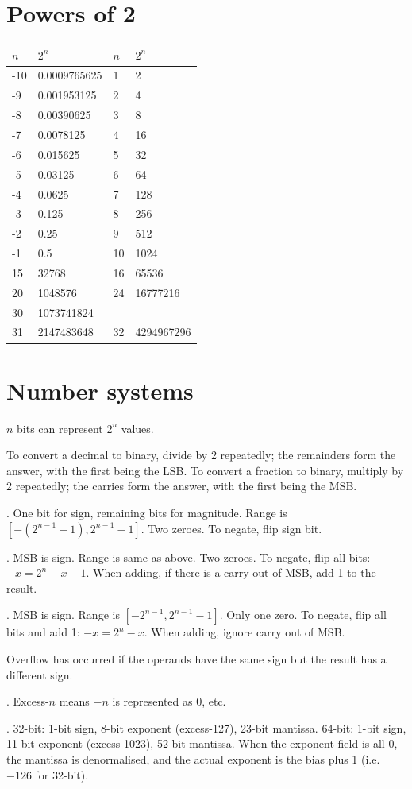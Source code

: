 \documentclass{slnotes}
\begin{document}
\chapter{Powers of 2}
\begin{tabular}{llll}
\toprule
\(n\) & \(2^n\) & \(n\) & \(2^n\) \tabularnewline
\midrule
-10 & 0.0009765625 & 1 & 2 \tabularnewline
-9  & 0.001953125  & 2 & 4 \tabularnewline
-8  & 0.00390625   & 3 & 8 \tabularnewline
-7  & 0.0078125    & 4 & 16 \tabularnewline
-6  & 0.015625     & 5 & 32 \tabularnewline
-5  & 0.03125      & 6 & 64 \tabularnewline
-4  & 0.0625       & 7 & 128 \tabularnewline
-3  & 0.125        & 8 & 256 \tabularnewline
-2  & 0.25         & 9 & 512 \tabularnewline
-1  & 0.5          & 10 & 1024 \tabularnewline
15 & 32768         & 16 & 65536 \tabularnewline
20 & 1048576       & 24 & 16777216 \tabularnewline
30 & 1073741824 \tabularnewline
31 & 2147483648    & 32 & 4294967296 \tabularnewline
\bottomrule
\end{tabular}
\chapter{Number systems}
\(n\) bits can represent \(2^n\) values.

To convert a decimal to binary, divide by 2 repeatedly; the remainders form the answer, with the first being the LSB. To convert a fraction to binary, multiply by 2 repeatedly; the carries form the answer, with the first being the MSB.

. One bit for sign, remaining bits for magnitude. Range is \([-(2^{n-1}-1), 2^{n-1}-1]\). Two zeroes. To negate, flip sign bit.

. MSB is sign. Range is same as above. Two zeroes. To negate, flip all bits: \(-x = 2^n - x - 1\). When adding, if there is a carry out of MSB, add 1 to the result.

. MSB is sign. Range is \([-2^{n-1}, 2^{n-1}-1]\). Only one zero. To negate, flip all bits and add 1: \(-x = 2^n - x\). When adding, ignore carry out of MSB.

Overflow has occurred if the operands have the same sign but the result has a different sign.

. Excess-\(n\) means \(-n\) is represented as 0, etc.

. 32-bit: 1-bit sign, 8-bit exponent (excess-127), 23-bit mantissa. 64-bit: 1-bit sign, 11-bit exponent (excess-1023), 52-bit mantissa. When the exponent field is all 0, the mantissa is denormalised, and the actual exponent is the bias plus 1 (i.e. \(-126\) for 32-bit).
\end{document}
